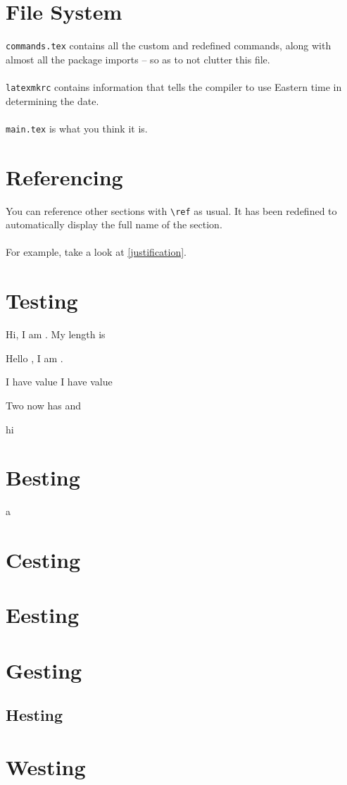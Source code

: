 \documentclass[12pt]{article}
\begin{document}
\section{File System}
\verb|commands.tex| contains all the custom and redefined commands, along with almost all the package imports -- so as to not clutter this file.
\\\\
\verb|latexmkrc| contains information that tells the compiler to use Eastern time in determining the date.
\\\\
\verb|main.tex| is what you think it is.

\section{Referencing}
You can reference other sections with \verb|\ref| as usual.
It has been redefined to automatically display the full name of the section.
\\\\
For example, take a look at \ref{justification}.

\section{Testing}
Hi, I am \arrone. My length is \getlen\arrone

Hello \arrone, I am \arrtwo.

I have value 
I have value 

Two now has \getlen\arrtwo and \getidx{}



hi
\section{Besting}
a
\section{Cesting}

\section{Eesting}

\section{Gesting}
\subsection{Hesting}

\section{Westing}
\end{document}

